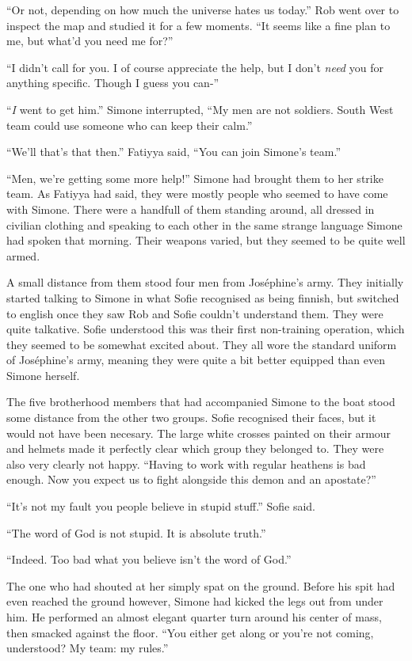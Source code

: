 \documentclass[letterpaper,12pt]{report}
\begin{document}
``Or not, depending on how much the universe hates us today.'' Rob went over to inspect the map and studied it for a few moments. ``It seems like a fine plan to me, but what'd you need me for?''

``I didn't call for you. I of course appreciate the help, but I don't \textit{need} you for anything specific. Though I guess you can-''

``\textit{I} went to get him.'' Simone interrupted, ``My men are not soldiers. South West team could use someone who can keep their calm.''

``We'll that's that then.'' Fatiyya said, ``You can join Simone's team.''
\act

``Men, we're getting some more help!'' Simone had brought them to her strike team. As Fatiyya had said, they were mostly people who seemed to have come with Simone. There were a handfull of them standing around, all dressed in civilian clothing and speaking to each other in the same strange language Simone had spoken that morning. Their weapons varied, but they seemed to be quite well armed.

A small distance from them stood four men from Jos\'ephine's army. They initially started talking to Simone in what Sofie recognised as being finnish, but switched to english once they saw Rob and Sofie couldn't understand them. They were quite talkative. Sofie understood this was their first non-training operation, which they seemed to be somewhat excited about. They all wore the standard uniform of Jos\'ephine's army, meaning they were quite a bit better equipped than even Simone herself.

The five brotherhood members that had accompanied Simone to the boat stood some distance from the other two groups. Sofie recognised their faces, but it would not have been necesary. The large white crosses painted on their armour and helmets made it perfectly clear which group they belonged to. They were also very clearly not happy. ``Having to work with regular heathens is bad enough. Now you expect us to fight alongside this demon and an apostate?''

``It's not my fault you people believe in stupid stuff.'' Sofie said.

``The word of God is not stupid. It is absolute truth.''

``Indeed. Too bad what you believe isn't the word of God.''

The one who had shouted at her simply spat on the ground. Before his spit had even reached the ground however, Simone had kicked the legs out from under him. He performed an almost elegant quarter turn around his center of mass, then smacked against the floor. ``You either get along or you're not coming, understood? My team: my rules.''
\end{document}
